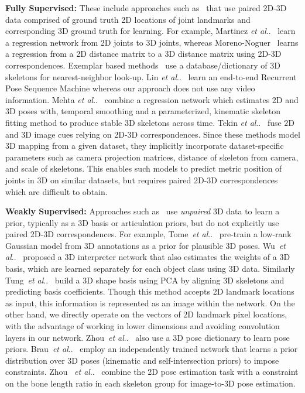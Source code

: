 \documentclass[runningheads]{llncs}
\makeatletter
\DeclareRobustCommand\onedot{\futurelet\@let@token\@onedot}
\def\@onedot{\ifx\@let@token.\else.\null\fi\xspace}
\def\etal{\emph{et al}\onedot}
\makeatother
\begin{document}
\textbf{Fully Supervised:} These include approaches such as~\cite{MartinezICCV2017,Nie_2017_ICCV,Li_2015_ICCV} that use paired 2D-3D data comprised of ground truth 2D locations of joint landmarks and corresponding 3D ground truth for learning. For example, Martinez \etal~\cite{MartinezICCV2017} learn a regression network from 2D joints to 3D joints, whereas Moreno-Noguer~\cite{Moreno-Noguer_2017_CVPR} learns a regression from a 2D distance matrix to a 3D distance matrix using 2D-3D correspondences. Exemplar based methods~\cite{ChenDeva2017,Yasin_2016_CVPR,jiang20103d} use a database/dictionary of 3D skeletons for nearest-neighbor look-up. Lin \etal~\cite{Lin_2017_CVPR} learn an end-to-end Recurrent Pose Sequence Machine whereas our approach does not use any video information. Mehta \etal~\cite{mehta2017vnect} combine a regression network which estimates 2D and 3D poses with, temporal smoothing and a parameterized, kinematic skeleton fitting method  to produce stable 3D skeletons across time. Tekin \etal~\cite{Tekin_2017_ICCV} fuse 2D and 3D image cues relying on 2D-3D correspondences. Since these methods model 3D mapping from a given dataset, they implicitly incorporate dataset-specific parameters such as camera projection matrices, distance of skeleton from camera, and scale of skeletons. This enables such models to predict metric position of joints {in 3D} on similar datasets, but requires paired 2D-3D correspondences which are difficult to obtain. 

\textbf{Weakly Supervised:} Approaches such as~\cite{Zhou_2016_CVPR,Tome_2017_CVPR,AAAI18_yxu_3dpose,Brau3DV2016} use \textit{unpaired} 3D data to learn a prior, typically as a 3D basis or articulation priors, but do not explicitly use paired 2D-3D correspondences. For example, Tome~\etal~\cite{Tome_2017_CVPR} pre-train a low-rank Gaussian model from 3D annotations as a prior for plausible 3D poses. Wu~\etal~\cite{InterpreterNetwork2016} proposed a 3D interpreter network that also estimates the weights of a 3D basis, which are learned separately for each object class using 3D data. Similarly Tung~\etal~\cite{Tung_2017_ICCV} build a 3D shape basis using PCA by aligning 3D skeletons and predicting basis coefficients. {Though this method accepts 2D landmark locations as input, this information is represented as an image within the network. On the other hand, we directly operate on the vectors of 2D landmark pixel locations, with the advantage of working in lower dimensions and avoiding convolution layers in our network.}  Zhou~\etal~\cite{Zhou_2016_CVPR} also use a 3D pose dictionary to learn pose priors. Brau~\etal~\cite{Brau3DV2016} employ an independently trained network that learns a prior distribution over 3D poses (kinematic and self-intersection priors) to impose constraints. Zhou ~\etal~ \cite{Towards_wild_Zhou} combine the 2D pose estimation task with a constraint on the bone length ratio in each skeleton group for image-to-3D pose estimation.
\end{document}
